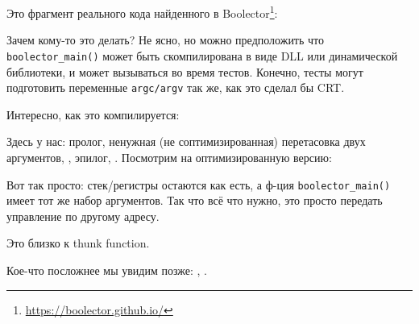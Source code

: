 \label{Boolector}

Это фрагмент реального кода найденного в Boolector\footnote{\url{https://boolector.github.io/}}:



Зачем кому-то это делать?
Не ясно, но можно предположить что \verb|boolector_main()| может быть скомпилирована в виде DLL или динамической библиотеки,
и может вызываться во время тестов.
Конечно, тесты могут подготовить переменные \verb|argc/argv| так же, как это сделал бы \ac{CRT}.

Интересно, как это компилируется:



Здесь у нас: пролог, ненужная (не соптимизированная) перетасовка двух аргументов, , эпилог, .
Посмотрим на оптимизированную версию:



Вот так просто: стек/регистры остаются как есть, а ф-ция \verb|boolector_main()| имеет тот же набор аргументов.
Так что всё что нужно, это просто передать управление по другому адресу.

Это близко к \gls{thunk function}.

Кое-что посложнее мы увидим позже: , .

